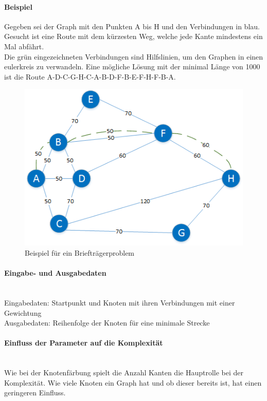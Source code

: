 	\paragraph{Beispiel} Gegeben sei der Graph mit den Punkten A bis H und den Verbindungen in blau.\\
Gesucht ist eine Route mit dem kürzesten Weg, welche jede Kante mindestens ein Mal abfährt. \cite{pearson2004decision}\\
Die grün eingezeichneten Verbindungen sind Hilfslinien, um den Graphen in einen \gls{eulerkreis} zu verwandeln. Eine mögliche Lösung mit der minimal Länge von 1000 ist die 
Route A-D-C-G-H-C-A-B-D-F-B-E-F-H-F-B-A.
\begin{figure}[h]
\centering
\includegraphics[scale=0.8]{images/visio/chinese_postman.png}
\caption[Beispiel für ein Briefträgerproblem]{Beispiel für ein Briefträgerproblem }
\label{fig:chinese_postman_example}
\end{figure}

	\paragraph{Eingabe- und Ausgabedaten}\mbox{}\\
	Eingabedaten: Startpunkt und Knoten mit ihren Verbindungen mit einer Gewichtung\\
	Ausgabedaten: Reihenfolge der Knoten für eine minimale Strecke

	\paragraph{Einfluss der Parameter auf die Komplexität}\mbox{}\\
	Wie bei der Knotenfärbung spielt die Anzahl Kanten die Hauptrolle bei der Komplexität. Wie viele Knoten ein Graph hat und ob dieser bereits  ist, hat einen 
	geringeren Einfluss.

